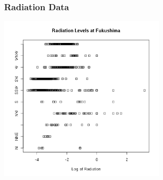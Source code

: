\begin{frame}
  \frametitle{Radiation Data}

  \begin{center}
    \includegraphics[width=8cm]{img/logFukushimaGammaByDirection}
  \end{center}  

\end{frame}


